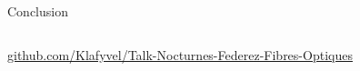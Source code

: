 \documentclass[aspectratio=149, 10pt, t]{beamer}
\begin{document}
\begin{frame}{Conclusion}
\begin{columns}
\begin{column}{0.6\linewidth}
            {\footnotesize \href{https://github.com/Klafyvel/Talk-Nocturnes-Federez-Fibres-Optiques}{github.com/Klafyvel/Talk-Nocturnes-Federez-Fibres-Optiques}}
        \end{column}
    \end{columns}
\end{frame}
\end{document}
